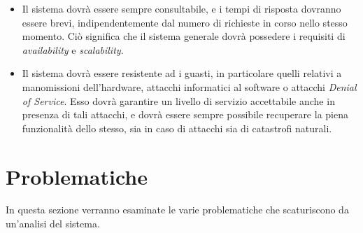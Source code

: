 \documentclass[a4paper,12pt]{report}
\begin{document}
\begin{itemize}
	\item Il sistema dovrà essere sempre consultabile, e i tempi di risposta dovranno essere brevi, indipendentemente dal numero di richieste in corso nello stesso momento. Ciò significa che il sistema generale dovrà possedere i requisiti di \emph{availability} e \emph{scalability}.
	\item Il sistema dovrà essere resistente ad i guasti, in particolare quelli relativi a manomissioni dell'hardware, attacchi informatici al software o attacchi \emph{Denial of Service}. Esso dovrà garantire un livello di servizio accettabile anche in presenza di tali attacchi, e dovrà essere sempre possibile recuperare la piena funzionalità dello stesso, sia in caso di attacchi sia di catastrofi naturali. 
\end{itemize}
\section{Problematiche}
In questa sezione verranno esaminate le varie problematiche che scaturiscono da un'analisi del sistema.
\end{document}
